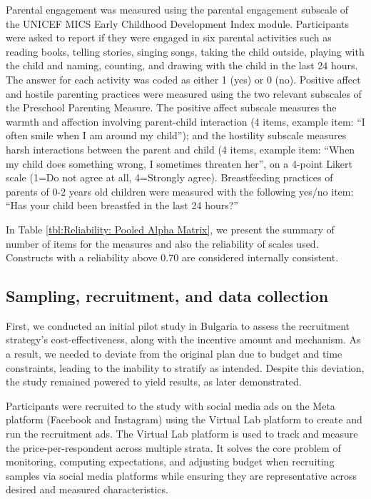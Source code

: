 Parental engagement was measured using the parental engagement subscale of the UNICEF MICS Early Childhood Development Index module. Participants were asked to report if they were engaged in six parental activities such as reading books, telling stories, singing songs, taking the child outside, playing with the child and naming, counting, and drawing with the child in the last 24 hours. The answer for each activity was coded as either 1 (yes) or 0 (no).
Positive affect and hostile parenting practices were measured using the two relevant subscales of the Preschool Parenting Measure. The positive affect subscale measures the warmth and affection involving parent-child interaction (4 items, example item: “I often smile when I am around my child”); and the hostility subscale measures harsh interactions between the parent and child (4 items, example item: “When my child does something wrong, I sometimes threaten her”, on a 4-point Likert scale (1=Do not agree at all, 4=Strongly agree).
Breastfeeding practices of parents of 0-2 years old children were measured with the following yes/no item: “Has your child been breastfed in the last 24 hours?”

In Table \ref{tbl:Reliability: Pooled Alpha Matrix}, we present the summary of number of items for the measures and also the reliability of scales used. Constructs with a reliability above 0.70 are considered internally consistent.



\subsection{Sampling, recruitment, and data collection}

First, we conducted an initial pilot study in Bulgaria to assess the recruitment strategy's cost-effectiveness, along with the incentive amount and mechanism. As a result, we needed to deviate from the original plan due to budget and time constraints, leading to the inability to stratify as intended. Despite this deviation, the study remained powered to yield results, as later demonstrated.

Participants were recruited to the study with social media ads on the Meta platform (Facebook and Instagram) using the Virtual Lab platform to create and run the recruitment ads. The Virtual Lab platform is used to track and measure the price-per-respondent across multiple strata. It solves the core problem of monitoring, computing expectations, and adjusting budget when recruiting samples via social media platforms while ensuring they are representative across desired and measured characteristics.

